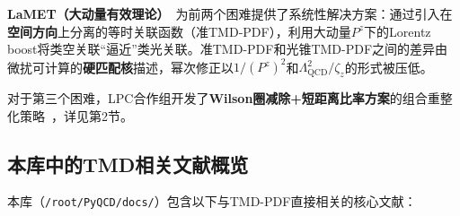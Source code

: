\documentclass[12pt,a4paper]{ctexart}
\theoremstyle{definition}
\begin{document}
\textbf{LaMET（大动量有效理论）}~\cite{Ji2013Euclidean,Ji2014LaMET}为前两个困难提供了系统性解决方案：通过引入在\textbf{空间方向}上分离的等时关联函数（准TMD-PDF），利用大动量$P^z$下的Lorentz boost将类空关联``逼近''类光关联。准TMD-PDF和光锥TMD-PDF之间的差异由微扰可计算的\textbf{硬匹配核}描述，幂次修正以$1/(P^z)^2$和$\Lambda_{\text{QCD}}^2/\zeta_z$的形式被压低。

对于第三个困难，LPC合作组开发了\textbf{Wilson圈减除+短距离比率方案}的组合重整化策略~\cite{Zhang2022renormTMD}，详见第2节。

\subsection{本库中的TMD相关文献概览}

本库（\texttt{/root/PyQCD/docs/}）包含以下与TMD-PDF直接相关的核心文献：
\end{document}
